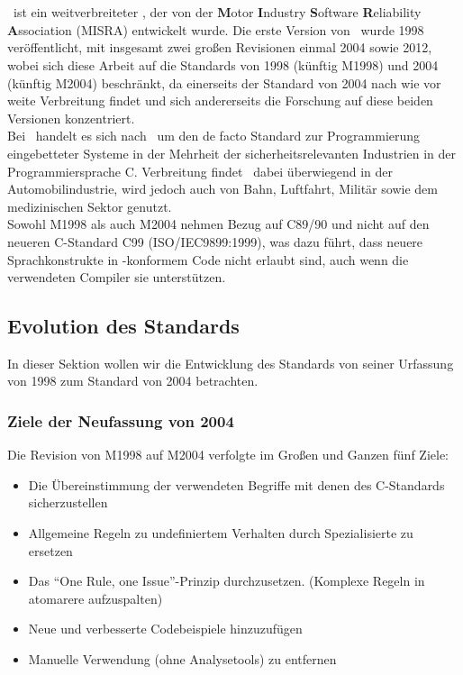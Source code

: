 \documentclass[a4paper,UKenglish,cleveref, autoref]{templates/lipics-v2019}
\begin{document}
    \section{\misra}
    \label{sec:misra-c}
    \misra\ ist ein weitverbreiteter \sqs,
    der von der \textbf{M}otor \textbf{I}ndustry \textbf{S}oftware \textbf{R}eliability \textbf{A}ssociation (MISRA) entwickelt wurde.
    Die erste Version von \misra\ wurde 1998 veröffentlicht, mit insgesamt zwei großen Revisionen einmal 2004 sowie 2012,
    wobei sich diese Arbeit auf die Standards von 1998 (künftig M1998) und 2004 (künftig M2004) beschränkt,
    da einerseits der Standard von 2004 nach wie vor weite Verbreitung findet und sich andererseits die Forschung
    auf diese beiden Versionen konzentriert.\\
    Bei \misra\ handelt es sich nach~\cite{misra-website} um den de facto Standard zur Programmierung eingebetteter Systeme
    in der Mehrheit der sicherheitsrelevanten Industrien in der Programmiersprache C\@.
    Verbreitung findet \misra\ dabei überwiegend in der Automobilindustrie, wird jedoch auch von Bahn, Luftfahrt, Militär
    sowie dem medizinischen Sektor genutzt.\\
    Sowohl M1998 als auch M2004 nehmen Bezug auf C89/90 und nicht auf den neueren C-Standard C99 (ISO/IEC9899:1999),
    was dazu führt, dass neuere Sprachkonstrukte in \misra-konformem Code nicht erlaubt sind,
    auch wenn die verwendeten Compiler sie unterstützen.

    \subsection{Evolution des Standards}
    \label{subsec:evolution-des-standards}

    In dieser Sektion wollen wir die Entwicklung des Standards von seiner Urfassung von 1998 zum Standard von 2004
    betrachten.

    \subsubsection{Ziele der Neufassung von 2004}
    Die Revision von M1998 auf M2004 verfolgte im Großen und Ganzen fünf Ziele:

    \begin{itemize}
        \item Die Übereinstimmung der verwendeten Begriffe mit denen des C-Standards sicherzustellen
        \item Allgemeine Regeln zu undefiniertem Verhalten durch Spezialisierte zu ersetzen
        \item Das \enquote{One Rule, one Issue}-Prinzip durchzusetzen.
            (Komplexe Regeln in atomarere aufzuspalten)
        \item Neue und verbesserte Codebeispiele hinzuzufügen
        \item Manuelle Verwendung (ohne Analysetools) zu entfernen
    \end{itemize}
\end{document}
